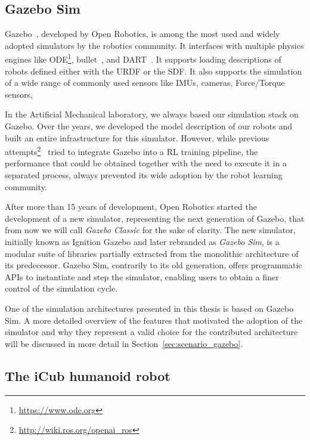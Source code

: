 \subsection{Gazebo Sim}

Gazebo~\parencite{koenig_design_2004}, developed by Open Robotics, is among the most used and widely adopted simulators by the robotics community.
It interfaces with multiple physics engines like ODE\footnote{\url{https://www.ode.org}}, bullet~\parencite{coumans_pybullet_2016}, and DART~\parencite{lee_dart_2018}.
It supports loading descriptions of robots defined either with the \ac{URDF} or the \ac{SDF}.
It also supports the simulation of a wide range of commonly used sensors like \acp{IMU}, cameras, Force/Torque sensors, \etc

In the Artificial Mechanical laboratory, we always based our simulation stack on Gazebo.
Over the years, we developed the model description of our robots and built an entire infrastructure for this simulator.
However, while previous attempts\footnote{\url{http://wiki.ros.org/openai_ros}}~\parencite{zamora_extending_2017,lopez_gym-gazebo2_2019} tried to integrate Gazebo into a \ac{RL} training pipeline, the performance that could be obtained together with the need to execute it in a separated process, always prevented its wide adoption by the robot learning community.

After more than 15 years of development, Open Robotics started the development of a new simulator, representing the next generation of Gazebo, that from now we will call \emph{Gazebo Classic} for the sake of clarity.
The new simulator, initially known as Ignition Gazebo and later rebranded as \emph{Gazebo Sim}, is a modular suite of libraries partially extracted from the monolithic architecture of its predecessor.
Gazebo Sim, contrarily to its old generation, offers programmatic \acp{API} to instantiate and step the simulator, enabling users to obtain a finer control of the simulation cycle.

One of the simulation architectures presented in this thesis is based on Gazebo Sim.
A more detailed overview of the features that motivated the adoption of the simulator and why they represent a valid choice for the contributed architecture will be discussed in more detail in Section~\ref{sec:scenario_gazebo}.

\subsection{The iCub humanoid robot}

